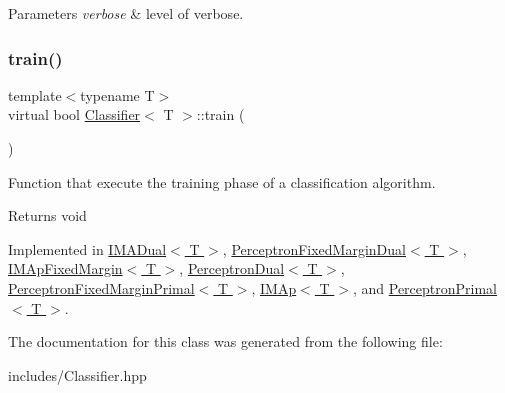 \begin{DoxyParams}{Parameters}
{\em verbose} & level of verbose. \\
\hline
\end{DoxyParams}
\mbox{\label{class_classifier_a120849bfdfa3ba7a0388b32b2d76bf4f}} 
\subsubsection{\texorpdfstring{train()}{train()}}
{\footnotesize\ttfamily template$<$typename T$>$ \\
virtual bool \hyperlink{class_classifier}{Classifier}$<$ T $>$\+::train (\begin{DoxyParamCaption}{ }\end{DoxyParamCaption})\hspace{0.3cm}{\ttfamily [pure virtual]}}



Function that execute the training phase of a classification algorithm. 

\begin{DoxyReturn}{Returns}
void 
\end{DoxyReturn}


Implemented in \hyperlink{class_i_m_a_dual_aff820af6454ceeef4d23af48476d7218}{I\+M\+A\+Dual$<$ T $>$}, \hyperlink{class_perceptron_fixed_margin_dual_a58a5acdd6afaedff53fab23779f01486}{Perceptron\+Fixed\+Margin\+Dual$<$ T $>$}, \hyperlink{class_i_m_ap_fixed_margin_a4d99742be5fe5a21b8ae6f99547a98c8}{I\+M\+Ap\+Fixed\+Margin$<$ T $>$}, \hyperlink{class_perceptron_dual_ac5e6aac8184fdf8f9d39d8d183d49190}{Perceptron\+Dual$<$ T $>$}, \hyperlink{class_perceptron_fixed_margin_primal_a6d4a14b9f39a4fef45de201edfeabce0}{Perceptron\+Fixed\+Margin\+Primal$<$ T $>$}, \hyperlink{class_i_m_ap_aa8bf6b0d21a76d388fe81ee516b627e4}{I\+M\+Ap$<$ T $>$}, and \hyperlink{class_perceptron_primal_ac6cafe7a8fabfb607761024ce60a6861}{Perceptron\+Primal$<$ T $>$}.



The documentation for this class was generated from the following file\+:\begin{DoxyCompactItemize}
\item 
includes/Classifier.\+hpp\end{DoxyCompactItemize}
